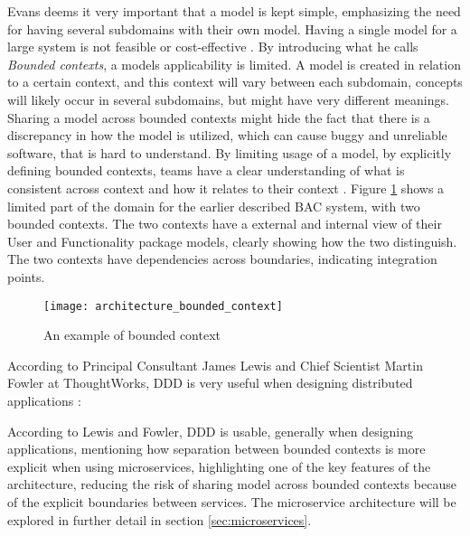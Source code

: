 Evans deems it very important that a model is kept simple, emphasizing the need for having several subdomains with their own model. Having a single model for a large system is not feasible or cost-effective \cite[p.~331]{evans2004domain}. By introducing what he calls \textit{Bounded contexts}, a models applicability is limited. A model is created in relation to a certain context, and this context will vary between each subdomain, concepts will likely occur in several subdomains, but might have very different meanings. Sharing a model across bounded contexts might hide the fact that there is a discrepancy in how the model is utilized, which can cause buggy and unreliable software, that is hard to understand. By limiting usage of a model, by explicitly defining bounded contexts, teams have a clear understanding of what is consistent across context and how it relates to their context \cite[p.~331]{evans2004domain}. Figure \ref{fig:architecture_bounded_context} shows a limited part of the domain for the earlier described BAC system, with two bounded contexts. The two contexts have a external and internal view of their User and Functionality package models, clearly showing how the two distinguish. The two contexts have dependencies across boundaries, indicating integration points.

\begin{figure}[!htb]
  \texttt{[image: architecture\_bounded\_context]}  
  \caption{An example of bounded context}
  \label{fig:architecture_bounded_context}
\end{figure}

According to Principal Consultant James Lewis and Chief Scientist Martin Fowler at ThoughtWorks, DDD is very useful when designing distributed applications \cite{fowler2014microservices}:


According to Lewis and Fowler, DDD is usable, generally when designing applications, mentioning how separation between bounded contexts is more explicit when using microservices, highlighting one of the key features of the architecture, reducing the risk of sharing model across bounded contexts because of the explicit boundaries between services. The microservice architecture will be explored in further detail in section \ref{sec:microservices}.


